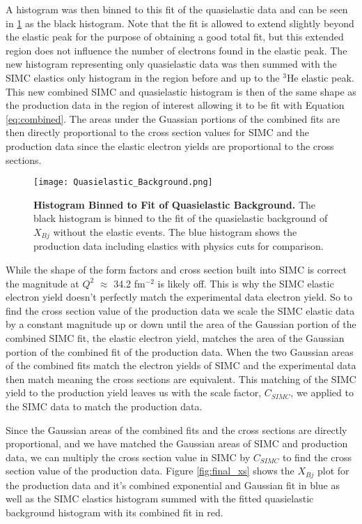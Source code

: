 A histogram was then binned to this fit of the quasielastic data and can be seen in \ref{fig:QE_background} as the black histogram. Note that the fit is allowed to extend slightly beyond the elastic peak for the purpose of obtaining a good total fit, but this extended region does not influence the number of electrons found in the elastic peak. The new histogram representing only quasielastic data was then summed with the SIMC elastics only histogram in the region before and up to the $^3$He elastic peak. This new combined SIMC and quasielastic histogram is then of the same shape as the production data in the region of interest allowing it to be fit with Equation \ref{eq:combined}. The areas under the Guassian portions of the combined fits are then directly proportional to the cross section values for SIMC and the production data since the elastic electron yields are proportional to the cross sections. 

\begin{figure}[!ht]
\begin{center}
\texttt{[image: Quasielastic\_Background.png]}
\end{center}
\caption[Histogram Binned to Fit of Quasielastic Background]{
{\bf{Histogram Binned to Fit of Quasielastic Background.}} The black histogram is binned to the fit of the quasielastic background of $X_{Bj}$ without the elastic events. The blue histogram shows the production data including elastics with physics cuts for comparison.}
\label{fig:QE_background}
\end{figure}

While the shape of the form factors and cross section built into SIMC is correct the magnitude at $Q^2$ $\approx$ 34.2 fm$^{-2}$ is likely off. This is why the SIMC elastic electron yield doesn't perfectly match the experimental data electron yield. So to find the cross section value of the production data we scale the SIMC elastic data by a constant magnitude up or down until the area of the Gaussian portion of the combined SIMC fit, the elastic electron yield, matches the area of the Gaussian portion of the combined fit of the production data. When the two Gaussian areas of the combined fits match the electron yields of SIMC and the experimental data then match meaning the cross sections are equivalent. This matching of the SIMC yield to the production yield leaves us with the scale factor, $C_{SIMC}$, we applied to the SIMC data to match the production data. 

Since the Gaussian areas of the combined fits and the cross sections are directly proportional, and we have matched the Gaussian areas of SIMC and production data, we can multiply the cross section value in SIMC by $C_{SIMC}$ to find the cross section value of the production data. Figure \ref{fig:final_xs} shows the $X_{Bj}$ plot for the production data and it's combined exponential and Gaussian fit in blue as well as the SIMC elastics histogram summed with the fitted quasielastic background histogram with its combined fit in red. 

